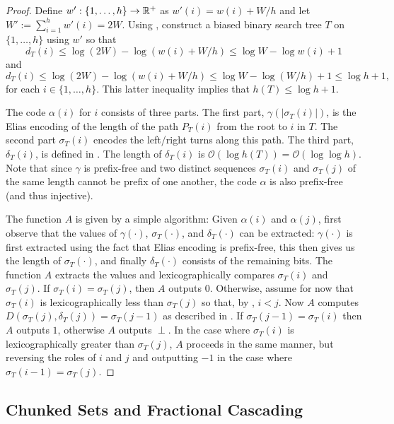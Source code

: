 \documentclass[kpfonts]{patmorin}
\newcommand{\Oh}{\mathcal{O}}
\let\le\leqslant
\begin{document}
\begin{proof}
  Define $w':\{1,\ldots,h\}\to \mathbb{R}^+$ as $w'(i)=w(i)+W/h$ and let $W':=\sum_{i=1}^h w'(i)=2W$.
  Using , construct a biased binary search tree $T$ on $\{1,\ldots,h\}$ using $w'$ so that
  \[
    d_T(i)\le\log (2W)-\log(w(i)+W/h) \le \log W-\log w(i)+1
  \]
  and
  \[
  d_T(i)\le\log (2W)-\log(w(i)+W/h) \le \log W-\log (W/h)+1 \le \log h + 1,
  \]
  for each $i\in\{1,\ldots,h\}$.  This latter inequality implies that $h(T)\le\log h + 1$.

  The code $\alpha(i)$ for $i$ consists of three parts.  The first part, $\gamma(|\sigma_T(i)|)$, is the Elias encoding of the length of the path $P_T(i)$ from the root to $i$ in $T$. The second part $\sigma_T(i)$ encodes the left/right turns along this path. The third part, $\delta_T(i)$, is defined in .
  The length of $\delta_T(i)$ is $\Oh(\log h(T))=\Oh(\log\log h)$. Note that since $\gamma$ is prefix-free and two distinct sequences $\sigma_T(i)$ and $\sigma_T(j)$ of the same length cannot be prefix of one another, the code $\alpha$ is also prefix-free (and thus injective).

  The function $A$ is given by a simple algorithm: Given $\alpha(i)$ and $\alpha(j)$, first observe that the values of $\gamma(\cdot)$, $\sigma_T(\cdot)$, and $\delta_T(\cdot)$ can be extracted: $\gamma(\cdot)$ is first extracted using the fact that Elias encoding is prefix-free, this then gives us the length of $\sigma_T(\cdot)$, and finally $\delta_T(\cdot)$ consists of the remaining bits.
   The function $A$ extracts the values and lexicographically compares $\sigma_T(i)$ and $\sigma_T(j)$.  If $\sigma_T(i)=\sigma_T(j)$, then $A$ outputs $0$.
   Otherwise, assume for now that $\sigma_T(i)$ is lexicographically less than $\sigma_T(j)$ so that, by , $i < j$.  Now $A$ computes $D(\sigma_T(j),\delta_T(j))=\sigma_T(j-1)$ as described in .
   If $\sigma_T(j-1)=\sigma_T(i)$ then $A$ outputs $1$, otherwise $A$ outputs $\perp$.
  In the case where $\sigma_T(i)$ is lexicographically greater than $\sigma_T(j)$, $A$ proceeds in the same manner, but reversing the roles of $i$ and $j$ and outputting $-1$ in the case where $\sigma_T(i-1)=\sigma_T(j)$.
\end{proof}

\subsection{Chunked Sets and Fractional Cascading}
\end{document}
